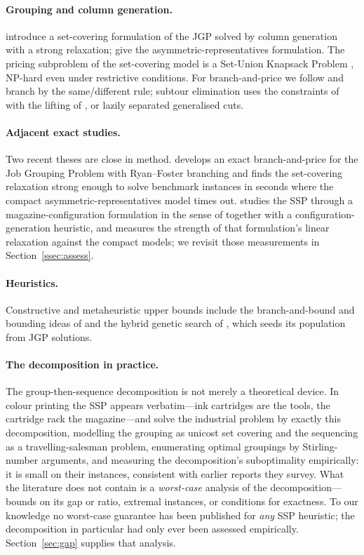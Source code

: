 \documentclass[11pt,a4paper]{article}
\theoremstyle{plain}
\theoremstyle{definition}
\theoremstyle{remark}
\begin{document}
\paragraph{Grouping and column generation.}
\citet{Crama1994Column} introduce a set-covering formulation of the JGP solved by
column generation with a strong relaxation; \citet{Jans2013} give the
asymmetric-representatives formulation. The pricing subproblem of the set-covering
model is a Set-Union Knapsack Problem \citep{Goldschmidt1994}, NP-hard even under
restrictive conditions. For branch-and-price we follow
\citet{Barnhart1998,Lubbecke2005,Vanderbeck2010} and branch by the
\citet{Ryan1981} same/different rule; subtour elimination uses the constraints of
\citet{Miller1960} with the lifting of \citet{DesrochersLaporte1991}, or lazily
separated generalised cuts.

\paragraph{Adjacent exact studies.}
Two recent theses are close in method. \citet{Otiai2026} develops an exact
branch-and-price for the Job Grouping Problem with Ryan--Foster branching and finds
the set-covering relaxation strong enough to solve benchmark instances in seconds
where the compact asymmetric-representatives model times out. \citet{Moreira2026}
studies the SSP through a magazine-configuration formulation in the sense of
\citet{Colares2026Exact} together with a configuration-generation heuristic, and
measures the strength of that formulation's linear relaxation against the compact
models; we revisit those measurements in Section~\ref{ssec:assess}.

\paragraph{Heuristics.}
Constructive and metaheuristic upper bounds include the branch-and-bound and
bounding ideas of \citet{Ghiani2010} and the hybrid genetic search of
\citet{Mecler2021}, which seeds its population from JGP solutions.

\paragraph{The decomposition in practice.}
The group-then-sequence decomposition is not merely a theoretical device. In colour
printing the SSP appears verbatim---ink cartridges are the tools, the cartridge rack
the magazine---and \citet{Burger2015} solve the industrial problem by exactly this
decomposition, modelling the grouping as unicost set covering and the sequencing as a
travelling-salesman problem, enumerating optimal groupings by Stirling-number
arguments, and measuring the decomposition's suboptimality empirically: it is small
on their instances, consistent with earlier reports they survey. What the literature
does not contain is a \emph{worst-case} analysis of the decomposition---bounds on its
gap or ratio, extremal instances, or conditions for exactness. To our knowledge no
worst-case guarantee has been published for \emph{any} SSP heuristic; the
decomposition in particular had only ever been assessed empirically.
Section~\ref{sec:gap} supplies that analysis.
\end{document}
